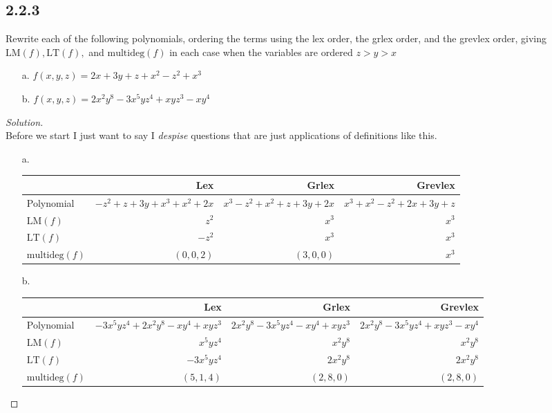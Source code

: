 \documentclass[]{article}
\newcommand\<{\langle}
\renewcommand\>{\rangle}
\newenvironment{solution}
{
	\begin{proof}[Solution] \text{ }
		\\
	}
	{
	\end{proof}
}
\begin{document}
\subsection*{2.2.3} Rewrite each of the following polynomials, ordering the terms using the lex order, the grlex order, and the grevlex order, giving $\text{LM}(f), \text{LT}(f),$ and $\text{multideg}(f)$ in each case when the variables are ordered $z > y > x$
\begin{enumerate}
	\item[a.] $f(x, y, z) = 2x + 3y + z + x^2 -z^2 + x^3$
	\item[b.] $f(x, y, z) = 2x^2y^8 - 3x^5yz^4 + xyz^3 - xy^4$
\end{enumerate}
\begin{solution}
		Before we start I just want to say I \textit{despise} questions that are just applications of definitions like this. 
\begin{enumerate}
	\item[a.] \text{ } \\
	\begin{tabular}{l|r|r|r}
		 & Lex & Grlex & Grevlex \\
		\hline
		Polynomial & $-z^2+z+3y+x^3+x^2+2x$ & $x^3 - z^2 + x^2 + z + 3y + 2x$ & $x^3 + x^2 - z^2+ 2x+ 3y + z$\\
		$\text{LM}(f)$ & $z^2$ & $x^3$ & $x^3$\\
		$\text{LT}(f)$ & $-z^2$ & $x^3$ & $x^3$\\
		$\text{multideg}(f)$ & $(0,0,2)$ & $(3,0,0)$ & $x^3$
	\end{tabular}
	\item[b.] \text{ } \\
	\begin{tabular}{l|r|r|r}
		& Lex & Grlex & Grevlex \\
		\hline
		Polynomial & $-3x^5yz^4 + 2x^2y^8 - xy^4 + xyz^3$ & $2x^2y^8 - 3x^5yz^4 - xy^4 + xyz^3$ & $2x^2y^8 - 3x^5yz^4 + xyz^3 - xy^4$\\
		$\text{LM}(f)$ & $x^5yz^4$ & $x^2y^8$ & $x^2y^8$ \\
		$\text{LT}(f)$ & $-3x^5yz^4$ & $2x^2y^8$ & $2x^2y^8$\\
		$\text{multideg}(f)$ & $(5,1,4)$ & $(2,8,0)$ & $(2,8,0)$
	\end{tabular}
\end{enumerate}
\end{solution}
\end{document}
